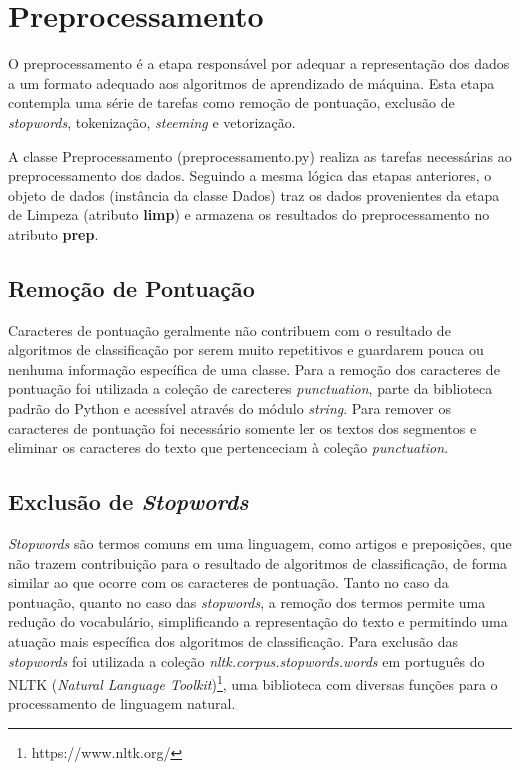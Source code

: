 \section{Preprocessamento}

O preprocessamento é a etapa responsável por adequar a representação dos dados a um formato adequado aos algoritmos de aprendizado de máquina. Esta etapa contempla uma série de tarefas como remoção de pontuação, exclusão de \textit{stopwords}, tokenização,  \textit{steeming} e vetorização.

A classe Preprocessamento (preprocessamento.py) realiza as tarefas necessárias ao preprocessamento dos dados. Seguindo a mesma lógica das etapas anteriores, o objeto de dados (instância da classe Dados) traz os dados provenientes da etapa de Limpeza (atributo \textbf{limp}) e armazena os resultados do preprocessamento no atributo \textbf{prep}.  

\subsection{Remoção de Pontuação}

Caracteres de pontuação geralmente não contribuem com o resultado de algoritmos de classificação por serem muito repetitivos e guardarem pouca ou nenhuma informação específica de uma classe. Para a remoção dos caracteres de pontuação foi utilizada a coleção de carecteres \textit{punctuation}, parte da biblioteca padrão do Python e acessível através do módulo \textit{string}. Para remover os caracteres de pontuação foi necessário somente ler os textos dos segmentos e eliminar os caracteres do texto que pertenceciam à coleção \textit{punctuation}.

\subsection{Exclusão de \textit{Stopwords}}

\textit{Stopwords} são termos comuns em uma linguagem, como artigos e preposições, que não trazem contribuição para o resultado de algoritmos de classificação, de forma similar ao que ocorre com os caracteres de pontuação. Tanto no caso da pontuação, quanto no caso das \textit{stopwords}, a remoção dos termos permite uma redução do vocabulário, simplificando a representação do texto e permitindo uma atuação mais específica dos algoritmos de classificação. Para exclusão das \textit{stopwords} foi utilizada a coleção \textit{nltk.corpus.stopwords.words} em português do NLTK (\textit{Natural Language Toolkit})\footnote{https://www.nltk.org/}, uma biblioteca com diversas funções para o processamento de linguagem natural.

